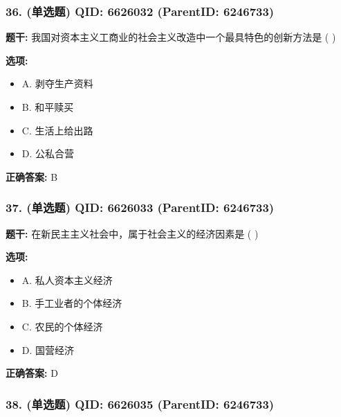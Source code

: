\documentclass[12pt,UTF8]{ctexart}
\begin{document}
\subsubsection*{36. (单选题) \small QID: 6626032 (ParentID: 6246733)}

\textbf{题干:}
我国对资本主义工商业的社会主义改造中一个最具特色的创新方法是  ( )



\textbf{选项:}
\begin{itemize}[leftmargin=*]

  \item A. 剥夺生产资料

  \item B. 和平赎买

  \item C. 生活上给出路

  \item D. 公私合营

\end{itemize}

\textbf{正确答案:}
B

\vspace{0.3em}\hrulefill\vspace{0.7em}

\subsubsection*{37. (单选题) \small QID: 6626033 (ParentID: 6246733)}

\textbf{题干:}
在新民主主义社会中，属于社会主义的经济因素是  ( )



\textbf{选项:}
\begin{itemize}[leftmargin=*]

  \item A. 私人资本主义经济

  \item B. 手工业者的个体经济

  \item C. 农民的个体经济

  \item D. 国营经济

\end{itemize}

\textbf{正确答案:}
D

\vspace{0.3em}\hrulefill\vspace{0.7em}

\subsubsection*{38. (单选题) \small QID: 6626035 (ParentID: 6246733)}
\end{document}
